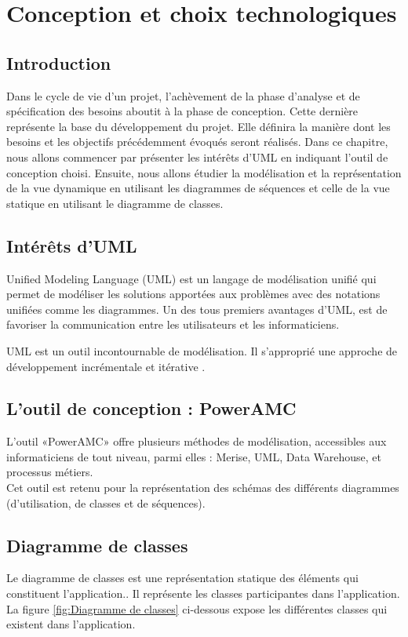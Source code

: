 \chapter{Conception et choix technologiques}

\section*{Introduction}
Dans le cycle de vie d'un projet, l'achèvement de la phase d'analyse et de spécification des besoins aboutit à la phase de conception. Cette dernière représente la base du développement du projet. Elle définira la manière dont les besoins et les objectifs précédemment évoqués seront réalisés. Dans ce chapitre, nous allons commencer par présenter les intérêts d’UML en indiquant l’outil de conception choisi. Ensuite, nous allons étudier la modélisation et la représentation de la vue dynamique en utilisant les diagrammes de séquences et celle de la vue statique en utilisant le diagramme de classes.

\section{Intérêts d’UML}
    Unified Modeling Language (UML) est un langage de modélisation unifié qui permet de modéliser les solutions apportées aux problèmes avec des notations unifiées comme les diagrammes. Un des tous premiers avantages d'UML, est de favoriser la communication entre les utilisateurs et les informaticiens.

UML est un outil incontournable de modélisation. Il s’approprié une approche de développement incrémentale et itérative \cite{UML}.

   \section{L’outil de conception : PowerAMC} 
   L’outil «PowerAMC» offre plusieurs méthodes de modélisation, accessibles aux informaticiens de tout niveau, parmi elles : Merise, UML, Data Warehouse, et processus métiers\cite{PowerAmc}.\\
   Cet outil est retenu pour la représentation des schémas des différents diagrammes (d’utilisation, de classes et de séquences).
   
        
       \section{Diagramme de classes} 
       Le diagramme de classes est une représentation statique des éléments qui constituent l'application.. Il représente les classes participantes dans l'application\cite{DiagrammeClasse}.
       La figure \ref{fig:Diagramme de classes} ci-dessous expose les différentes classes qui existent dans l’application.
       
